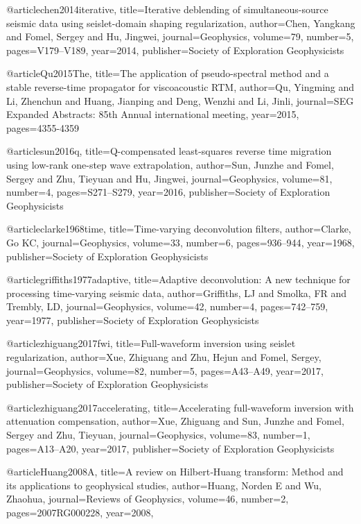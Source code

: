{@article{chen2014iterative,
  title={Iterative deblending of simultaneous-source seismic data using seislet-domain shaping regularization},
  author={Chen, Yangkang and Fomel, Sergey and Hu, Jingwei},
  journal={Geophysics},
  volume={79},
  number={5},
  pages={V179--V189},
  year={2014},
  publisher={Society of Exploration Geophysicists}
}

@article{Qu2015The,
  title={The application of pseudo-spectral method and a stable reverse-time propagator for viscoacoustic {RTM}},
  author={Qu, Yingming and Li, Zhenchun and Huang, Jianping and Deng, Wenzhi and Li, Jinli},
  journal={SEG Expanded Abstracts: 85th Annual international meeting},
  year={2015},
  pages={4355-4359}
}

@article{sun2016q,
  title={Q-compensated least-squares reverse time migration using low-rank one-step wave extrapolation},
  author={Sun, Junzhe and Fomel, Sergey and Zhu, Tieyuan and Hu, Jingwei},
  journal={Geophysics},
  volume={81},
  number={4},
  pages={S271--S279},
  year={2016},
  publisher={Society of Exploration Geophysicists}
}

@article{clarke1968time,
  title={Time-varying deconvolution filters},
  author={Clarke, Go KC},
  journal={Geophysics},
  volume={33},
  number={6},
  pages={936--944},
  year={1968},
  publisher={Society of Exploration Geophysicists}
}

@article{griffiths1977adaptive,
  title={Adaptive deconvolution: A new technique for processing time-varying seismic data},
  author={Griffiths, LJ and Smolka, FR and Trembly, LD},
  journal={Geophysics},
  volume={42},
  number={4},
  pages={742--759},
  year={1977},
  publisher={Society of Exploration Geophysicists}
}

@article{zhiguang2017fwi,
  title={Full-waveform inversion using seislet regularization},
  author={Xue, Zhiguang and Zhu, Hejun and Fomel, Sergey},
  journal={Geophysics},
  volume={82},
  number={5},
  pages={A43--A49},
  year={2017},
  publisher={Society of Exploration Geophysicists}
}

@article{zhiguang2017accelerating,
  title={Accelerating full-waveform inversion with attenuation compensation},
  author={Xue, Zhiguang and Sun, Junzhe and Fomel, Sergey and Zhu, Tieyuan},
  journal={Geophysics},
  volume={83},
  number={1},
  pages={A13--A20},
  year={2017},
  publisher={Society of Exploration Geophysicists}
}

@article{Huang2008A,
  title={A review on {H}ilbert‐{H}uang transform: {M}ethod and its applications to geophysical studies},
  author={Huang, Norden E and Wu, Zhaohua},
  journal={Reviews of Geophysics},
  volume={46},
  number={2},
  pages={2007RG000228},
  year={2008},
}

}
